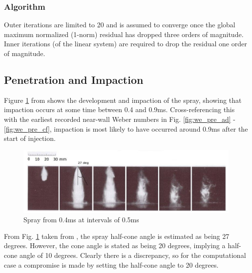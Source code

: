 \documentclass[a4paper,10pt]{article}
\begin{document}
\subsubsection{Algorithm}
Outer iterations are limited to 20 and is assumed to converge once the global maximum normalized (1-norm) residual has dropped three orders of magnitude. Inner iterations (of the linear system) are required to drop the residual one order of magnitude.



\subsection{Penetration and Impaction}
Figure \ref{fig:park_spr} from \cite{park2004} shows the development and impaction of the spray, showing that impaction occurs at some time between 0.4 and 0.9ms. Cross-referencing this with the earliest recorded near-wall Weber numbers in Fig. \ref{fig:we_pre_ad} - \ref{fig:we_pre_cf}, impaction is most likely to have occurred around 0.9ms after the start of injection.
\begin{figure}[H]
\centering
\includegraphics[width=0.99\textwidth]{fig4.eps}
\caption{Spray from 0.4ms at intervals of 0.5ms}
\label{fig:park_spr}
\end{figure}
From Fig. \ref{fig:park_spr} taken from \cite{park2004}, the spray half-cone angle is estimated as being 27 degrees. However, the cone angle is stated as being 20 degrees, implying a half-cone angle of 10 degrees. Clearly there is a discrepancy, so for the computational case a compromise is made by setting the half-cone angle to 20 degrees.
\end{document}
